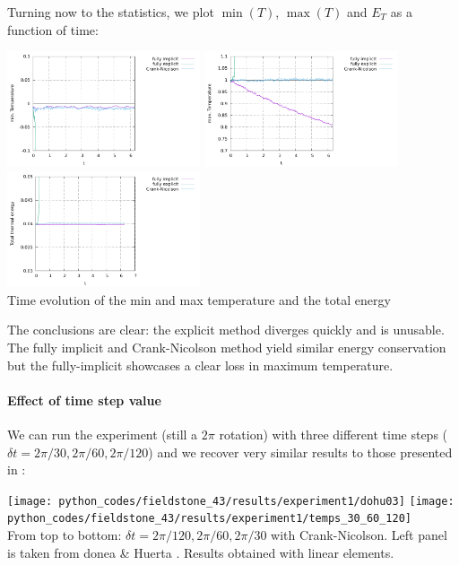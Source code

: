 Turning now to the statistics, we plot $\min(T)$, $\max(T)$ and $E_T$ as a function of time:
\begin{center}
\includegraphics[width=5.7cm]{python_codes/fieldstone_43/results/experiment1/Tmin.pdf}
\includegraphics[width=5.7cm]{python_codes/fieldstone_43/results/experiment1/Tmax.pdf}
\includegraphics[width=5.7cm]{python_codes/fieldstone_43/results/experiment1/ET.pdf}\\
{\captionfont Time evolution of the min and max temperature and the total energy}
\end{center}
The conclusions are clear: the explicit method diverges quickly and is unusable. 
The fully implicit and Crank-Nicolson 
method yield similar energy conservation but the fully-implicit showcases 
a clear loss in maximum temperature.

\paragraph{Effect of time step value} 
We can run the experiment (still a $2\pi$ rotation) 
with three different time steps ($\delta t=2\pi/30,2\pi/60,2\pi/120$) 
and we recover very similar results to those presented in \cite{dohu03}:
\begin{center}
\texttt{[image: python\_codes/fieldstone\_43/results/experiment1/dohu03]}
\texttt{[image: python\_codes/fieldstone\_43/results/experiment1/temps\_30\_60\_120]}\\
{\captionfont From top to bottom: $\delta t=2\pi/120,2\pi/60,2\pi/30$ with Crank-Nicolson. Left panel is taken from donea \& Huerta \cite{dohu03}. Results obtained with linear elements.}
\end{center}



